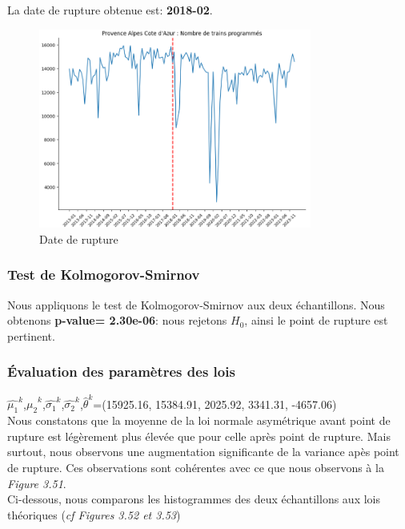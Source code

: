{La date de rupture obtenue est: \textbf{2018-02}. 

\begin{figure}[H]
  \centering
  \includegraphics[width=0.8\textwidth]{PACA_TP_3.png}
  \caption{Date de rupture}
\end{figure}

\subsubsection{Test de Kolmogorov-Smirnov}

Nous appliquons le test de Kolmogorov-Smirnov aux deux échantillons. Nous obtenons \textbf{p-value= 2.30e-06}: nous rejetons $H_0$, ainsi le point de rupture est pertinent.

\subsubsection{Évaluation des paramètres des lois}

$\hat{\mu_1}^k$,$\hat{\mu_2}^k$,$\hat{\sigma_1}^k$,$\hat{\sigma_2}^k$,$\hat{\theta}^k$=(15925.16, 15384.91,  2025.92,  3341.31, -4657.06)\\

Nous constatons que la moyenne de la loi normale asymétrique avant point de rupture est légèrement plus élevée que pour celle après point de rupture. Mais surtout, nous observons une augmentation significante de la variance apès point de rupture. Ces observations sont cohérentes avec ce que nous observons à la \textit{Figure 3.51}.\\


Ci-dessous, nous comparons les histogrammes des deux échantillons aux lois théoriques (\textit{cf Figures 3.52 et 3.53})

}
